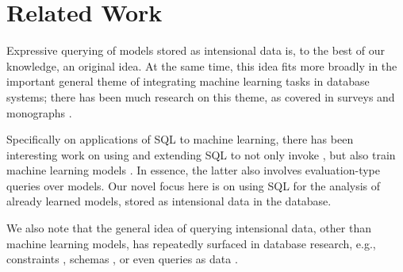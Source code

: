 \section{Related Work}
\label{secrel}

Expressive querying of models stored as intensional data is, to
the best of our knowledge, an original idea.  At the same time,
this idea fits more broadly in the important general theme of
integrating machine learning tasks in database systems; there has
been much research on this theme, as covered in surveys and
monographs \cite{boehmbook,declarmlsurvey,ss-m-ml-lifecycle-survey}.

Specifically on applications of SQL to machine learning, there
has been interesting work on using and extending SQL to not only
invoke \cite{madlib}, but also train machine learning models
\cite{jermaine_linalgebra,ml2sql,sql4ml}.  In essence, the
latter also involves evaluation-type queries over models.
Our novel focus here is on using SQL for the analysis of
already learned models, stored as intensional data in the
database.

We also note that the general idea of querying 
intensional data, other than machine
learning models, has repeatedly surfaced in database research,
e.g., constraints \cite{kkr_cql}, schemas \cite{schemasql2},
or even queries as data \cite{stoneb_queldatatype,metasql}.
